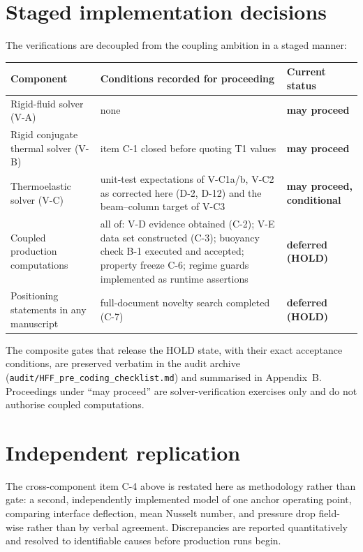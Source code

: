 \section{Staged implementation decisions}
The verifications are decoupled from the coupling ambition in a staged manner:
\begin{center}
\begin{tabular}{p{4.2cm}p{7.2cm}p{3.0cm}}
\toprule
Component & Conditions recorded for proceeding & Current status \\
\midrule
Rigid-fluid solver (V-A) & none & \textbf{may proceed} \\
Rigid conjugate thermal solver (V-B) & item C-1 closed before quoting T1 values & \textbf{may proceed} \\
Thermoelastic solver (V-C) & unit-test expectations of V-C1a/b, V-C2 as corrected here (D-2, D-12) and the beam--column target of V-C3 & \textbf{may proceed, conditional} \\
Coupled production computations & all of: V-D evidence obtained (C-2); V-E data set constructed (C-3); buoyancy check B-1 executed and accepted; property freeze C-6; regime guards implemented as runtime assertions & \textbf{deferred (HOLD)} \\
Positioning statements in any manuscript & full-document novelty search completed (C-7) & \textbf{deferred (HOLD)} \\
\bottomrule
\end{tabular}
\end{center}
The composite gates that release the HOLD state, with their exact acceptance conditions, are
preserved verbatim in the audit archive (\texttt{audit/HFF\_pre\_coding\_checklist.md}) and
summarised in Appendix~B. Proceedings under ``may proceed'' are solver-verification exercises only
and do not authorise coupled computations.

\section{Independent replication}
\label{sec:replication}
The cross-component item C-4 above is restated here as methodology rather than gate: a second,
independently implemented model of one anchor operating point, comparing interface deflection,
mean Nusselt number, and pressure drop field-wise rather than by verbal agreement. Discrepancies
are reported quantitatively and resolved to identifiable causes before production runs begin.
